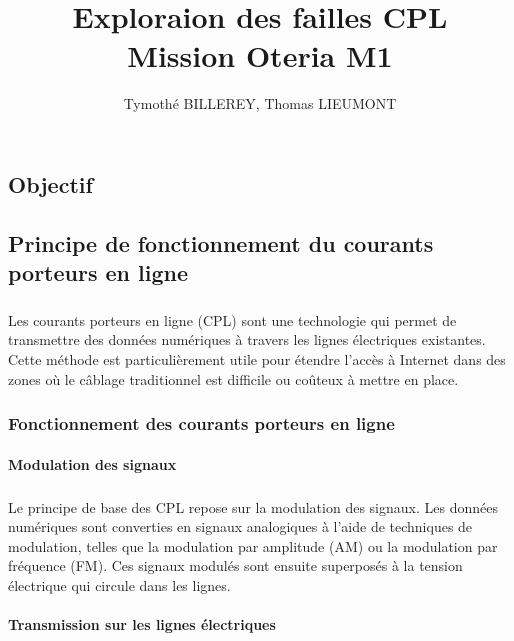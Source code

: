 \documentclass[a4paper,draft,twocolumn]{report}
\title{\Huge{Exploraion des failles CPL}\\Mission Oteria M1}
\author{Tymothé BILLEREY, Thomas LIEUMONT}
\date{}
\begin{document}
\maketitle
\newpage %
\newpage
{}
\tableofcontents
\pagebreak

\chapter{}

\section{Objectif}


\section{Principe de fonctionnement du courants porteurs en ligne}
\paragraph{} Les courants porteurs en ligne (CPL) sont une technologie qui permet de transmettre des données numériques à travers les lignes électriques existantes. Cette méthode est particulièrement utile pour étendre l'accès à Internet dans des zones où le câblage traditionnel est difficile ou coûteux à mettre en place.

\subsection{Fonctionnement des courants porteurs en ligne}

\subsubsection{Modulation des signaux}
\paragraph{} Le principe de base des CPL repose sur la modulation des signaux. Les données numériques sont converties en signaux analogiques à l'aide de techniques de modulation, telles que la modulation par amplitude (AM) ou la modulation par fréquence (FM). Ces signaux modulés sont ensuite superposés à la tension électrique qui circule dans les lignes.

\subsubsection{Transmission sur les lignes électriques}
\end{document}
